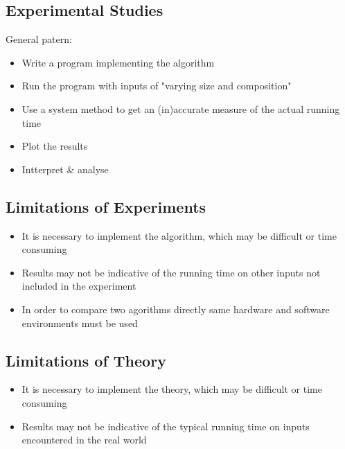 \documentclass{article}
\begin{document}
\begin{flushleft}
\section{Experimental Studies}
General patern:
\begin{itemize}
	\item Write a program implementing the algorithm
	\item Run the program with inputs of "varying size and composition"
	\item Use a system method to get an (in)accurate measure of the actual running time
	\item Plot the results
	\item Intterpret \& analyse
\end{itemize}
\end{flushleft}

\begin{flushleft}
\section{Limitations of Experiments}
\begin{itemize}
	\item It is necessary to implement the algorithm, which may be difficult or time consuming
	\item Results may not be indicative of the running time on other inputs not included in the experiment
	\item In order to compare two agorithms directly same hardware and software environments must be used
\end{itemize}
\end{flushleft}

\begin{flushleft}
\section{Limitations of Theory}
\begin{itemize}
	\item It is necessary to implement the theory, which may be difficult or time consuming
	\item Results may not be indicative of the typical running time on inputs encountered in the real world
\end{itemize}
\end{flushleft}
\end{document}
